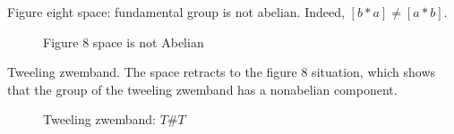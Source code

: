 \begin{eg}
    Figure eight space: fundamental group is not abelian.
    Indeed, $[b * a] \neq  [a * b]$.
\begin{figure}[H]
    \centering
    \caption{Figure 8 space is not Abelian}
    \label{fig:figure-8-not-abelian}
\end{figure}
\end{eg}
\begin{eg}
    Tweeling zwemband.
    The space retracts to the figure $8$ situation, which shows that the group of the tweeling zwemband has a nonabelian component.
    \begin{figure}[H]
        \centering
        \caption{Tweeling zwemband: $T \# T$}
        \label{fig:tweeling-zwemband}
    \end{figure}
\end{eg}
